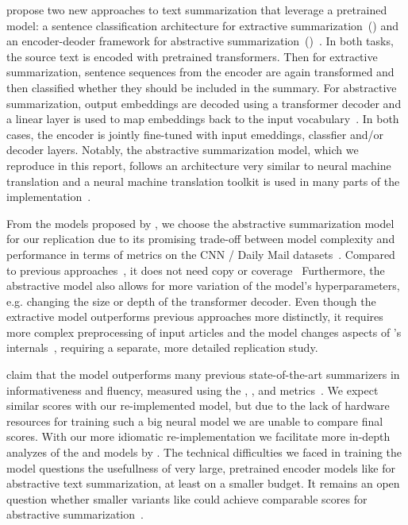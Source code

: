 \citeauthor{LiuL2019} propose two new approaches to text summarization that leverage a pretrained \Bert model: a sentence classification architecture for extractive summarization~(\BertSumExt) and an encoder-deoder framework for abstractive summarization~(\BertSumAbs)~\cite{LiuL2019}.
In both tasks, the source text is encoded with pretrained \Bert transformers. Then for extractive summarization, sentence sequences from the \Bert encoder are again transformed and then classified whether they should be included in the summary.
For abstractive summarization, \Bert output embeddings are decoded using a transformer decoder and a linear layer is used to map embeddings back to the input vocabulary~\cite{LiuL2019}. In both cases, the \Bert encoder is jointly fine-tuned with input emeddings, classfier and/or decoder layers.
Notably, the abstractive summarization model, which we reproduce in this report,
follows an architecture very similar to neural machine translation and a neural machine translation toolkit is used in many parts of the \BertSumAbs implementation~\cite{KleinKDSR2017}.

From the models proposed by \citeauthor{LiuL2019}, we choose the \BertSumAbs abstractive summarization model for our replication due to its promising trade-off between model complexity and performance in terms of \Rouge metrics on the CNN / Daily Mail datasets~\cite{LiuL2019,HermannKGEKSB2015}.
Compared to previous approaches~\cite{SeeLM2017,PaulusXS2018}, it does not need copy or coverage~\cite{LiuL2019}
Furthermore, the abstractive model also allows for more variation of the model's hyperparameters, e.g. changing the size or depth of the transformer decoder. 
Even though the extractive model \BertSumExt outperforms previous approaches more  distinctly, it requires more complex preprocessing of input articles and the model changes aspects of \Bert's internals~\cite{LiuL2019}, requiring a separate, more detailed replication study.

\citeauthor{LiuL2019} claim that the \BertSumAbs model outperforms many previous state-of-the-art summarizers in informativeness and fluency, measured using the , , and \RougeL metrics~\cite{LiuL2019,Lin2004}.
We expect similar scores with our re-implemented model, but due to the lack of hardware resources for training such a big neural model we are unable to compare final \Rouge scores.
With our more idiomatic re-implementation we facilitate more in-depth analyzes of the \BertSumAbs and \TransformerAbs models by \citeauthor{LiuL2019}.
The technical difficulties we faced in training the \BertSumAbs model questions the usefullness of very large, pretrained encoder models like \Bert for abstractive text summarization, at least on a smaller budget. It remains an open question whether smaller variants like \BertTiny could achieve comparable \Rouge scores for abstractive summarization~\cite{TurcCLT2019}.
